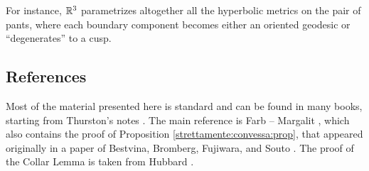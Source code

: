 For instance, $\mathbb{R}^3$ parametrizes altogether all the hyperbolic metrics on the pair of pants, where each boundary component becomes either an oriented geodesic or ``degenerates'' to a cusp.

\subsection{References}
Most of the material presented here is standard and can be found in many books, starting from Thurston's notes \cite{Th}. The main reference is Farb -- Margalit \cite{FM}, which also contains the proof of Proposition \ref{strettamente:convessa:prop}, that appeared originally in a paper of Bestvina, Bromberg, Fujiwara, and Souto \cite{BBFS}. The proof of the Collar Lemma is taken from Hubbard \cite{Hu}.

